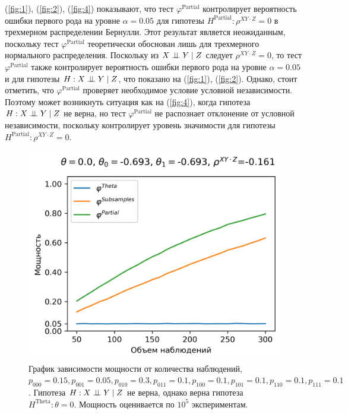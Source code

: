 (\autoref{fig:1}), (\autoref{fig:2}), (\autoref{fig:4}) показывают,
что тест $\varphi^{\text{Partial}}$ контролирует вероятность
ошибки первого рода на уровне $\alpha=0.05$ для гипотезы
$H^\text{Partial}: \rho^{XY\cdot Z}=0$ в трехмерном
распределении Бернулли. Этот результат является неожиданным,
поскольку тест $\varphi^{\text{Partial}}$ теоретически обоснован
лишь для трехмерного нормального распределения.
Поскольку из $X \perp\!\!\!\perp Y \mid Z$
следует $\rho^{XY\cdot Z}=0$, то тест $\varphi^{\text{Partial}}$ также
контролирует вероятность ошибки первого рода на уровне $\alpha=0.05$
и для гипотезы $H: X \perp\!\!\!\perp Y \mid Z$, что показано на 
(\autoref{fig:1}), (\autoref{fig:2}).
Однако, стоит отметить,
что $\varphi^{\text{Partial}}$ проверяет необходимое условие 
условной независимости. Поэтому может возникнуть ситуация
как на (\autoref{fig:4}), когда гипотеза $H: X \perp\!\!\!\perp Y \mid Z$ не верна, 
но тест $\varphi^{\text{Partial}}$ не распознает отклонение от условной независимости, поскольку
контролирует уровень значимости для гипотезы $H^{\text{Partial}}: \rho^{XY\cdot Z}=0$.

\begin{figure}[H]
    \centering
    \includegraphics[scale=0.55]{images/graph5.png}
    \caption{График зависимости мощности от количества наблюдений,
    $p_{000}=0.15, p_{001}=0.05, 
    p_{010}=0.3, p_{011}=0.1,
    p_{100}=0.1, p_{101}=0.1, p_{110}=0.1, p_{111}=0.1$. 
    Гипотеза $H: X \perp\!\!\!\perp Y \mid Z$ не верна, однако верна гипотеза $H^{\text{Theta}}: \theta=0$.
    Мощность оценивается по $10^5$ экспериментам.} \label{fig:5}
\end{figure}

